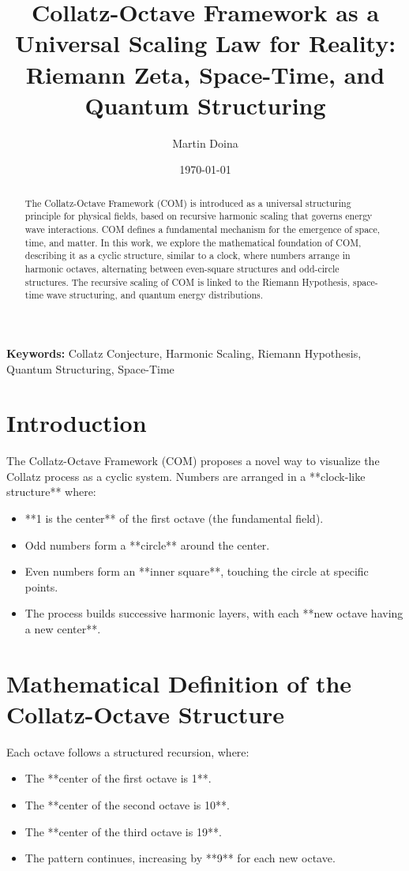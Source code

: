 \documentclass[a4paper,12pt]{article}
\title{Collatz-Octave Framework as a Universal Scaling Law for Reality: \\ Riemann Zeta, Space-Time, and Quantum Structuring}
\author{Martin Doina}
\date{\today}
\begin{document}
\maketitle

\begin{abstract}
The Collatz-Octave Framework (COM) is introduced as a universal structuring principle for physical fields, based on recursive harmonic scaling that governs energy wave interactions. COM defines a fundamental mechanism for the emergence of space, time, and matter. 
In this work, we explore the mathematical foundation of COM, describing it as a cyclic structure, similar to a clock, where numbers arrange in harmonic octaves, alternating between even-square structures and odd-circle structures. The recursive scaling of COM is linked to the Riemann Hypothesis, space-time wave structuring, and quantum energy distributions.
\end{abstract}

\textbf{Keywords:} Collatz Conjecture, Harmonic Scaling, Riemann Hypothesis, Quantum Structuring, Space-Time

\section{Introduction}
The Collatz-Octave Framework (COM) proposes a novel way to visualize the Collatz process as a cyclic system. Numbers are arranged in a **clock-like structure** where:
\begin{itemize}
    \item **1 is the center** of the first octave (the fundamental field).
    \item Odd numbers form a **circle** around the center.
    \item Even numbers form an **inner square**, touching the circle at specific points.
    \item The process builds successive harmonic layers, with each **new octave having a new center**.
\end{itemize}

\section{Mathematical Definition of the Collatz-Octave Structure}
Each octave follows a structured recursion, where:
\begin{itemize}
    \item The **center of the first octave is 1**.
    \item The **center of the second octave is 10**.
    \item The **center of the third octave is 19**.
    \item The pattern continues, increasing by **9** for each new octave.
\end{itemize}
\end{document}
